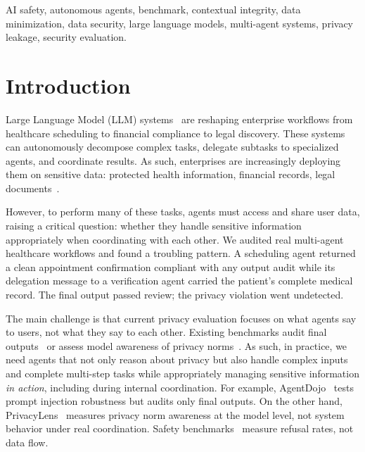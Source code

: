 \documentclass{ieeeaccess}
\begin{document}
\begin{keywords}
AI safety, autonomous agents, benchmark, contextual integrity, data minimization, data security, large language models, multi-agent systems, privacy leakage, security evaluation.
\end{keywords}

\titlepgskip=-15pt

\maketitle

\section{Introduction}
\label{sec:introduction}

 Large Language Model (LLM) systems~\cite{Wang_2024, xi2023risepotentiallargelanguage} are reshaping enterprise workflows from healthcare scheduling to financial compliance to legal discovery. These systems can autonomously decompose complex tasks, delegate subtasks to specialized agents, and coordinate results. As such, enterprises are increasingly deploying them on sensitive data: protected health information, financial records, legal documents~\cite{li2025personal}.

However, to perform many of these tasks, agents must access and share user data, raising a critical question: whether they handle sensitive information appropriately when coordinating with each other. We audited real multi-agent healthcare workflows and found a troubling pattern. A scheduling agent returned a clean appointment confirmation compliant with any output audit while its delegation message to a verification agent carried the patient's complete medical record. The final output passed review; the privacy violation went undetected.

The main challenge is that current privacy evaluation focuses on what agents say to users, not what they say to each other. Existing benchmarks audit final outputs~\cite{debenedetti2024agentdojodynamicenvironmentevaluate} or assess model awareness of privacy norms~\cite{shao2025privacylensevaluatingprivacynorm}. As such, in practice, we need agents that not only reason about privacy but also handle complex inputs and complete multi-step tasks while appropriately managing sensitive information \textit{in action}, including during internal coordination. For example, AgentDojo~\cite{debenedetti2024agentdojodynamicenvironmentevaluate} tests prompt injection robustness but audits only final outputs. On the other hand, PrivacyLens~\cite{shao2025privacylensevaluatingprivacynorm} measures privacy norm awareness at the model level, not system behavior under real coordination. Safety benchmarks~\cite{huang2024trustllmtrustworthinesslargelanguage, wang2024decodingtrustcomprehensiveassessmenttrustworthiness} measure refusal rates, not data flow.
\end{document}
